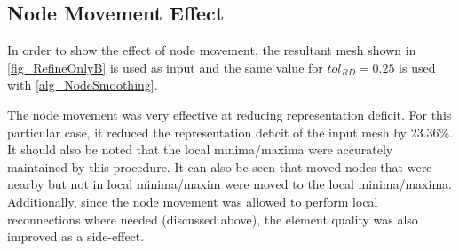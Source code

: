 \subsection{Node Movement Effect}
In order to show the effect of node movement, the resultant mesh shown
in \ref{fig_RefineOnlyB} is used as input and the same value for
$tol_{RD} = 0.25$ is used with \ref{alg_NodeSmoothing}.

\begin{figure}[h!]
  \begin{center}
  \label{fig_NodeSmoothing}
 

  \end{center}
\end{figure}

The node movement was very effective at reducing representation deficit.
For this particular case, it reduced the representation deficit of the
input mesh by $23.36\%$. It should also be noted that the local
minima/maxima were accurately maintained by this procedure. It can also
be seen that moved nodes that were nearby but not in local minima/maxim
were moved to the local minima/maxima. Additionally, since the node
movement was allowed to perform local reconnections where needed
(discussed above), the element quality was also improved as a
side-effect.


